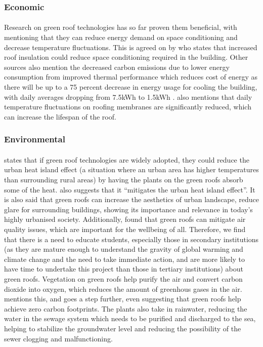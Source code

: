 \documentclass[a4paper]{article}
\begin{document}
\begin{multicols}{2}
  \subsubsection{Economic}
  \paragraph{} Research on green roof technologies has so far proven them
  beneficial, with \cite{energeff} mentioning that they can reduce energy
  demand on space conditioning and decrease temperature fluctuations. This
  is agreed on by \cite{CFGRSG} who states that increased roof insulation
  could reduce space conditioning required in the building. Other
  sources also mention the decreased carbon emissions due to lower energy
  consumption from improved thermal performance \parencite{CommAwareGBSyd}
  which reduces cost of energy as there will be up to a 75 percent
  decrease in energy usage for cooling the building, with daily averages
  dropping from 7.5kWh to 1.5kWh \parencite{energeff}. \cite{energeff} also
  mentions that daily temperature fluctuations on roofing membranes are
  significantly reduced, which can increase the lifespan of the roof.


  \subsubsection{Environmental}
  \paragraph{} \cite{energeff} states that if green roof technologies
  are widely adopted, they could reduce the urban heat island effect (a
  situation where an urban area has higher temperatures than surrounding
  rural areas) by having the plants on the green roofs absorb some of the
  heat. \cite{HKGreenRoofGL} also suggests that it ``mitigates the urban
  heat island effect''. It is also said that green roofs can increase the
  aesthetics of urban landscape, reduce glare for surrounding buildings,
  showing its importance and relevance in today's highly urbanised
  society. Additionally, \cite{HKGreenRoofGL} found that green roofs
  can mitigate air quality issues, which are important for the wellbeing
  of all. Therefore, we find that there is a need to educate students,
  especially those in secondary institutions (as they are mature enough to
  understand the gravity of global warming and climate change and the need
  to take immediate action, and are more likely to have time to undertake
  this project than those in tertiary institutions) about green roofs.
  Vegetation on green roofs help purify the air and convert carbon
  dioxide into oxygen, which reduces the amount of greenhous gases in
  the air. \parencite{energeff} mentions this, and \cite{CommAwareGBSyd}
  goes a step further, even suggesting that green roofs help achieve zero
  carbon footprints. The plants also take in rainwater, reducing the
  water in the sewage system which needs to be purified and discharged
  to the sea, helping to stabilize the groundwater level and reducing
  the possibility of the sewer clogging and malfunctioning.



\end{multicols}
\end{document}
